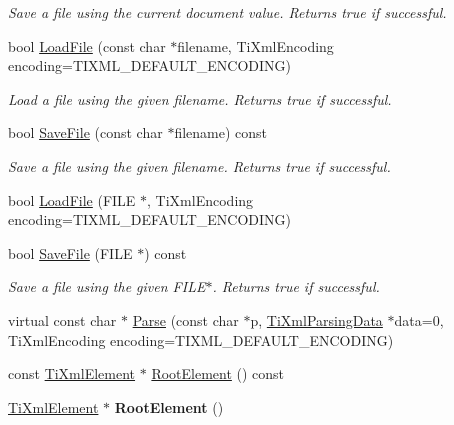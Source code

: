 \begin{DoxyCompactItemize}
\begin{DoxyCompactList}\small\item\em \-Save a file using the current document value. \-Returns true if successful. \end{DoxyCompactList}\item 
\hypertarget{class_ti_xml_document_a879cdf5e981b8b2d2ef82f2546dd28fb}{bool \hyperlink{class_ti_xml_document_a879cdf5e981b8b2d2ef82f2546dd28fb}{\-Load\-File} (const char $\ast$filename, \-Ti\-Xml\-Encoding encoding=\-T\-I\-X\-M\-L\-\_\-\-D\-E\-F\-A\-U\-L\-T\-\_\-\-E\-N\-C\-O\-D\-I\-N\-G)}\label{class_ti_xml_document_a879cdf5e981b8b2d2ef82f2546dd28fb}

\begin{DoxyCompactList}\small\item\em \-Load a file using the given filename. \-Returns true if successful. \end{DoxyCompactList}\item 
\hypertarget{class_ti_xml_document_ae869f5ebf7fc54c4a1d737fb4689fd44}{bool \hyperlink{class_ti_xml_document_ae869f5ebf7fc54c4a1d737fb4689fd44}{\-Save\-File} (const char $\ast$filename) const }\label{class_ti_xml_document_ae869f5ebf7fc54c4a1d737fb4689fd44}

\begin{DoxyCompactList}\small\item\em \-Save a file using the given filename. \-Returns true if successful. \end{DoxyCompactList}\item 
bool \hyperlink{class_ti_xml_document_a41f6fe7200864d1dca663d230caf8db6}{\-Load\-File} (\-F\-I\-L\-E $\ast$, \-Ti\-Xml\-Encoding encoding=\-T\-I\-X\-M\-L\-\_\-\-D\-E\-F\-A\-U\-L\-T\-\_\-\-E\-N\-C\-O\-D\-I\-N\-G)
\item 
\hypertarget{class_ti_xml_document_acf1672b4538c6d1d441f9f108aea2bf4}{bool \hyperlink{class_ti_xml_document_acf1672b4538c6d1d441f9f108aea2bf4}{\-Save\-File} (\-F\-I\-L\-E $\ast$) const }\label{class_ti_xml_document_acf1672b4538c6d1d441f9f108aea2bf4}

\begin{DoxyCompactList}\small\item\em \-Save a file using the given \-F\-I\-L\-E$\ast$. \-Returns true if successful. \end{DoxyCompactList}\item 
virtual const char $\ast$ \hyperlink{class_ti_xml_document_a789ad2f06f93d52bdb5570b2f3670289}{\-Parse} (const char $\ast$p, \hyperlink{class_ti_xml_parsing_data}{\-Ti\-Xml\-Parsing\-Data} $\ast$data=0, \-Ti\-Xml\-Encoding encoding=\-T\-I\-X\-M\-L\-\_\-\-D\-E\-F\-A\-U\-L\-T\-\_\-\-E\-N\-C\-O\-D\-I\-N\-G)
\item 
const \hyperlink{class_ti_xml_element}{\-Ti\-Xml\-Element} $\ast$ \hyperlink{class_ti_xml_document_ad09d17927f908f40efb406af2fb873be}{\-Root\-Element} () const 
\item 
\hypertarget{class_ti_xml_document_a0b43e762a23f938b06651bc90b8a1013}{\hyperlink{class_ti_xml_element}{\-Ti\-Xml\-Element} $\ast$ {\bfseries \-Root\-Element} ()}\label{class_ti_xml_document_a0b43e762a23f938b06651bc90b8a1013}


\end{DoxyCompactItemize}
